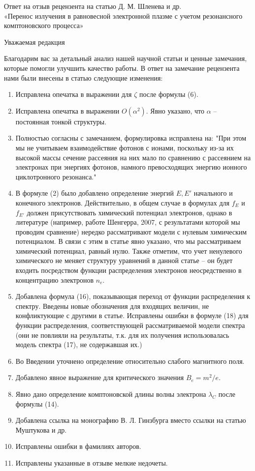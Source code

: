 \documentclass[14pt, russian]{article}
\begin{document}
\begin{center}
Ответ на отзыв рецензента на статью Д. М. Шленева и др.\\
«Перенос излучения в равновесной электронной плазме
с учетом резонансного комптоновского процесса»

\vspace{5mm}
Уважаемая редакция
\end{center}

Благодарим вас за детальный анализ нашей научной статьи и ценные замечания, которые помогли улучшить качество работы.
В ответ на замечание рецензента нами были внесены в статью следующие изменения:
\begin{enumerate}
	\item Исправлена опечатка в выражении для $\zeta$ после формулы (6).
	\item Исправлена опечатка в выражении $O(\alpha^2)$. Явно указано, что $\alpha$ -- постоянная 
     тонкой структуры.
	\item Полностью согласны с замечанием, формулировка исправлена на: "При этом мы не учитываем 
   взаимодействие фотонов с ионами, поскольку из-за их высокой массы сечение рассеяния на них мало по 
   сравнению с рассеянием на электронах при энергиях фотонов, намного превосходящих энергию ионного 
   циклотронного резонанса."
	\item В формуле (2) было добавлено определение энергий $E, E'$ начального и конечного электронов. 
   Действительно, в общем случае в формулах для $f_E$ и $f_{E'}$ должен присутствовать химический потенциал 
  электронов, однако в литературе (например, работе Шенгерра, 2007, с результатами которой мы проводим 
   сравнение) нередко рассматривают модели с нулевым химическим потенциалом. В связи с этим в статье явно 
  указано, что мы рассматриваем химический потенциал, равный нулю. Также отметим, что учет ненулевого 
   химического не меняет структуру уравнений в данной статье -- он будет входить посредством функции 
  распределения электронов неосредственно в концентрацию электронов $n_e$.
	\item Добавлена формула (16), показывающая переход от функции распределения к спектру. 
    Введены новые обозначения для входящих величин, не конфликтующие с другими в статье. Исправлены 
   ошибки в формуле (18) для функции распределения, соответствующей рассматриваемой модели спектра 
   (они не повлияли на результаты, т.к. для их получения использовалась модель спектра (17), не содержавшая их.)
	\item Во Введении уточнено определение относительно слабого магнитного поля.
	\item Добавлено явное выражение для критического значения $B_e = m^2/e$.
	\item Явно дано определение комптоновской длины волны электрона $\lambda_C$ после формулы (14).
	\item Добавлена ссылка на монографию В. Л. Гинзбурга вместо ссылки на статью Муштукова и др.
	\item Исправлены ошибки в фамилиях авторов.
	\item Исправлены указанные в отзыве мелкие недочеты.
	
\end{enumerate} 
\end{document}
